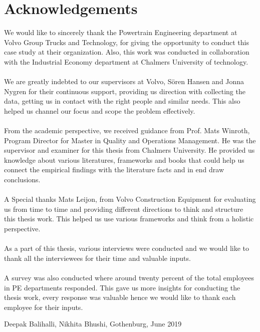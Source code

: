 \thispagestyle{plain}			%
\section*{Acknowledgements}
We would like to sincerely thank the Powertrain Engineering department at Volvo Group Trucks and Technology, for giving the opportunity to conduct this case study at their organization. Also, this work was conducted in collaboration with the Industrial Economy department at Chalmers University of technology.
\\
\\
We are greatly indebted to our supervisors at Volvo, Sören Hansen and Jonna Nygren for their continuous support, providing us direction with collecting the data, getting us in contact with the right people and similar needs. This also helped us channel our focus and scope the problem effectively.
\\
\\
From the academic perspective, we received guidance from Prof. Mats Winroth, Program Director for Master in Quality and Operations Management. He was the supervisor and examiner for this thesis from Chalmers University. He provided us knowledge about various literatures, frameworks and books that could help us connect the empirical findings with the literature facts and in end draw conclusions.
\\
\\
A Special thanks Mats Leijon, from Volvo Construction Equipment for evaluating us from time to time and providing different directions to think and structure this thesis work. This helped us use various frameworks and think from a holistic perspective.
\\
\\
As a part of this thesis, various interviews were conducted and we would like to thank all the interviewees for their time and valuable inputs. 
\\
\\
A survey was also conducted where around twenty percent of the total employees in PE departments responded. This gave us more insights for conducting the thesis work, every response was valuable hence we would like to thank each employee for their inputs.   


\vspace{1.5cm}
\hfill
Deepak Balihalli, Nikhita Bhushi, Gothenburg, June 2019

\newpage				%
\thispagestyle{empty}
\mbox{}